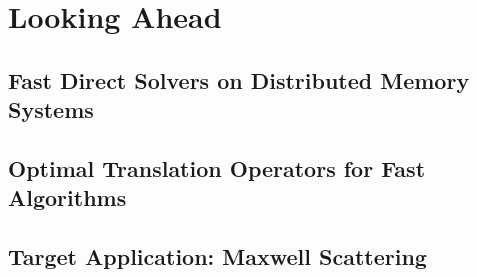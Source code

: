 \chapter{Looking Ahead}\label{chpt:3}


\section{Fast Direct Solvers on Distributed Memory Systems}\label{sec:3_1}


\section{Optimal Translation Operators for Fast Algorithms}\label{sec:3_2}


\section{Target Application: Maxwell Scattering}\label{sec:3_3}

